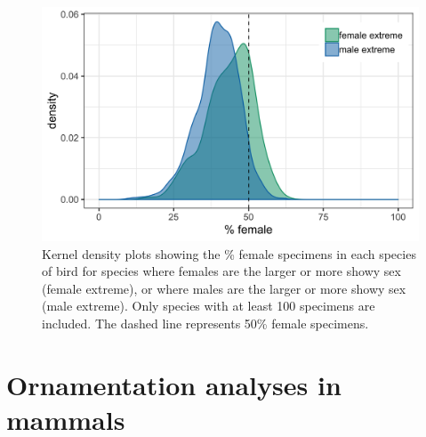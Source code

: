 \documentclass[a4paper, 12pt]{article}
\begin{document}
\begin{figure}[H]
 \centering
  \includegraphics[width = \linewidth]{figures/female-extreme.png}
  \caption{Kernel density plots showing the \% female specimens in each species of bird for species where females are the larger or more showy sex (female extreme), or where males are the larger or more showy sex (male extreme). 
  Only species with at least 100 specimens are included. 
  The dashed line represents 50\% female specimens. }
  \label{fig-reverse}
\end{figure}

\newpage
\section{Ornamentation analyses in mammals}
\end{document}
